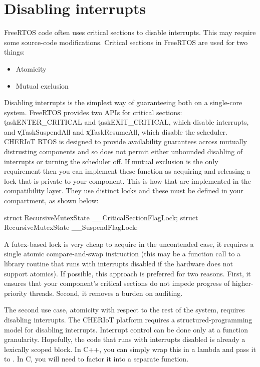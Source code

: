 \section{Disabling interrupts}

FreeRTOS code often uses critical sections to disable interrupts.
This may require some source-code modifications.
Critical sections in FreeRTOS are used for two things:

\begin{itemize}
	\item{Atomicity}
	\item{Mutual exclusion}
\end{itemize}

Disabling interrupts is the simplest way of guaranteeing both on a single-core system.
FreeRTOS provides two APIs for critical sections: \c{taskENTER_CRITICAL} and \c{taskEXIT_CRITICAL}, which disable interrupts, and \c{vTaskSuspendAll} and \c{xTaskResumeAll}, which disable the scheduler.
CHERIoT RTOS is designed to provide availability guarantees across mutually distrusting components and so does not permit either unbounded disabling of interrupts or turning the scheduler off.
If mutual exclusion is the only requirement then you can implement these function as acquiring and releasing a lock that is private to your component.
This is how that are implemented in the compatibility layer.
They use distinct locks and these must be defined in your compartment, as shown below:

\begin{cxxsnippet}
struct RecursiveMutexState __CriticalSectionFlagLock;
struct RecursiveMutexState __SuspendFlagLock;
\end{cxxsnippet}

A futex-based lock is very cheap to acquire in the uncontended case, it requires a single atomic compare-and-swap instruction (this may be a function call to a library routine that runs with interrupts disabled if the hardware does not support atomics).
If possible, this approach is preferred for two reasons.
First, it ensures that your component's critical sections do not impede progress of higher-priority threads.
Second, it removes a burden on auditing.

The second use case, atomicity with respect to the rest of the system, requires disabling interrupts.
The CHERIoT platform requires a structured-programming model for disabling interrupts.
Interrupt control can be done only at a function granularity.
Hopefully, the code that runs with interrupts disabled is already a lexically scoped block.
In C++, you can simply wrap this in a lambda and pass it to .
In C, you will need to factor it into a separate function.

